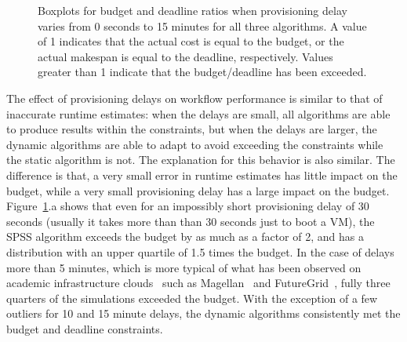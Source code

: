 \documentclass[conference]{IEEEtran}
\begin{document}
\begin{figure}[tb]
    \caption[Boxplots for budget and deadline ratios when provisioning delays occur]{Boxplots for budget and deadline ratios when provisioning delay varies from 0 seconds to 15 minutes for all three algorithms. A value of 1 indicates that the actual cost is equal to the budget, or the actual makespan is equal to the deadline, respectively. Values greater than 1 indicate that the budget/deadline has been exceeded.}
    \label{fig:delays}
\end{figure}

The effect of provisioning delays on workflow performance is similar to that of inaccurate runtime estimates: when the delays are small, all algorithms are able to produce results within the constraints, but when the delays are larger, the dynamic algorithms are able to adapt to avoid exceeding the constraints while the static algorithm is not. The explanation for this behavior is also similar. The difference is that, a very small error in runtime estimates has little impact on the budget, while a very small provisioning delay has a large impact on the budget. Figure~\ref{fig:delays}.a shows that even for an impossibly short provisioning delay of 30 seconds (usually it takes more than than 30 seconds just to boot a VM), the SPSS algorithm exceeds the budget by as much as a factor of 2, and has a distribution with an upper quartile of 1.5 times the budget. In the case of delays more than 5 minutes, which is more typical of what has been observed on academic infrastructure clouds~\cite{Juve2011} such as Magellan~\cite{Magellan} and FutureGrid~\cite{FutureGrid}, fully three quarters of the simulations exceeded the budget. With the exception of a few outliers for 10 and 15 minute delays, the dynamic algorithms consistently met the budget and deadline constraints.
\end{document}

